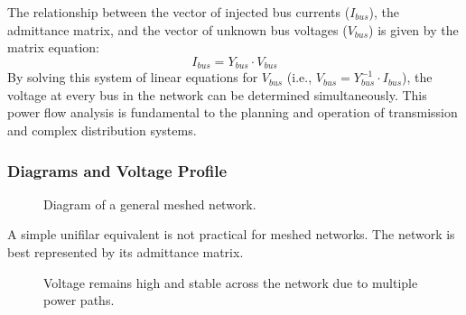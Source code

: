 \documentclass[12pt, a4paper]{article}
\begin{document}
The relationship between the vector of injected bus currents ($I_{bus}$), the admittance matrix, and the vector of unknown bus voltages ($V_{bus}$) is given by the matrix equation:
\begin{equation}
    I_{bus} = Y_{bus} \cdot V_{bus}
\end{equation}
By solving this system of linear equations for $V_{bus}$ (i.e., $V_{bus} = Y_{bus}^{-1} \cdot I_{bus}$), the voltage at every bus in the network can be determined simultaneously. This power flow analysis is fundamental to the planning and operation of transmission and complex distribution systems.

\subsubsection{Diagrams and Voltage Profile}
\begin{figure}[htbp]
    \centering
    \caption{Diagram of a general meshed network.}
    \label{fig:meshed_diagram}
\end{figure}

A simple unifilar equivalent is not practical for meshed networks. The network is best represented by its admittance matrix.

\begin{figure}[htbp]
    \centering
    \caption{Voltage remains high and stable across the network due to multiple power paths.}
    \label{fig:meshed_profile}
\end{figure}
\end{document}
